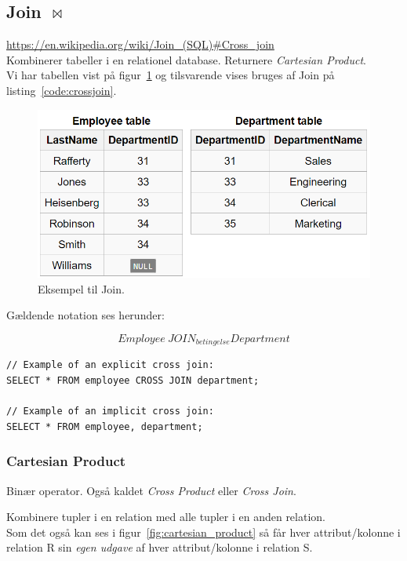 \subsection{Join $\Join$}

\url{https://en.wikipedia.org/wiki/Join_(SQL)#Cross_join}\\

Kombinerer tabeller i en relationel database. Returnere \textit{Cartesian Product}.\\
Vi har tabellen vist på figur~\ref{fig:employee_dept} og tilsvarende vises bruges af Join på listing~\ref{code:crossjoin}.

\begin{figure}[H]
\centering
\includegraphics[width=0.6\linewidth]{figs/spm6/employee_dept}
\caption{Eksempel til Join.}
\label{fig:employee_dept}
\end{figure}

Gældende notation ses herunder:

\begin{equation*}
Employee~JOIN_{betingelse} Department
\end{equation*}

\begin{lstlisting}[caption=SQL for Cross Join,label=code:crossjoin,morekeywords={SELECT, FROM, WHERE, CROSS, JOIN}]
// Example of an explicit cross join:
SELECT * FROM employee CROSS JOIN department;

// Example of an implicit cross join:
SELECT * FROM employee, department;
\end{lstlisting}

\subsubsection{Cartesian Product}
Binær operator. Også kaldet \textit{Cross Product} eller \textit{Cross Join}. 

Kombinere tupler i en relation med alle tupler i en anden relation.\\

Som det også kan ses i figur~\ref{fig:cartesian_product} så får hver attribut/kolonne i relation R sin \textit{egen udgave} af hver attribut/kolonne i relation S.

